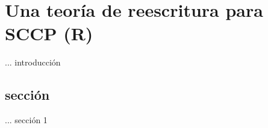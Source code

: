 \chapter{Una teor\'ia de reescritura para SCCP (R)}
\label{cap4.sccp}

... introducci\'on

\section{secci\'on}
\label{s1.formal}

... secci\'on 1
